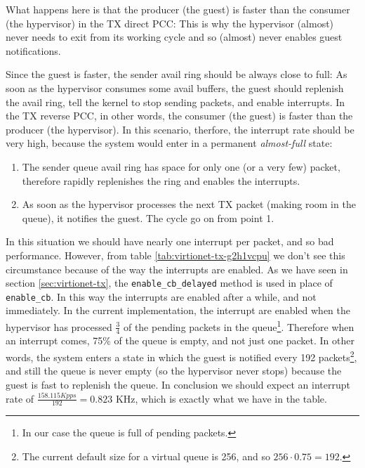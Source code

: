 What happens here is that the producer (the guest) is faster than the consumer (the hypervisor) in the TX direct PCC: This is why the 
hypervisor (almost) never needs to exit from its working cycle and so (almost) never enables guest notifications.

\vspace{0.5cm}

Since the guest is faster, the sender avail ring
should be always close to full: As soon as the hypervisor consumes some avail buffers, the guest should replenish the avail ring, tell the 
kernel to stop sending packets, and enable interrupts. In the TX reverse PCC, in other words, the consumer (the guest) is faster than the
producer (the hypervisor).
In this scenario, therfore, the interrupt rate should be very high, because the system would
enter in a permanent \emph{almost-full} state:
\begin{enumerate}
  \item The sender queue avail ring has space for only one (or a very few) packet, therefore rapidly replenishes the ring and enables the
	interrupts.
  \item As soon as the hypervisor processes the next TX packet (making room in the queue), it notifies the guest. The cycle go on from
	point 1.
\end{enumerate}
In this situation we should have nearly one interrupt per packet, and so bad performance. However, from table 
\ref{tab:virtionet-tx-g2h1vcpu} we don't see this circumstance because of the way the interrupts are enabled. As we have seen in 
section \ref{sec:virtionet-tx}, the \texttt{enable\_cb\_delayed} method is used in place of \texttt{enable\_cb}. In this way the interrupts
are enabled after a while, and not immediately. In the current implementation, the interrupt are enabled when the hypervisor has processed
$\frac{3}{4}$ of the pending packets in the queue\footnote{In our case the queue is full of pending packets.}. Therefore when an interrupt
comes, 75\% of the queue is empty, and not just one packet. In other words, the system enters a state in which the guest is notified every
192 packets\footnote{The current default size for a virtual queue is 256, and so $256 \cdot 0.75 = 192$.}, and still the queue is never
empty (so the hypervisor never stops) because the guest is fast to replenish the queue. In conclusion we should expect an interrupt rate of
$\frac{158.115 Kpps}{192} = 0.823$ KHz, which is exactly what we have in the table.

\vspace{0.5cm}

